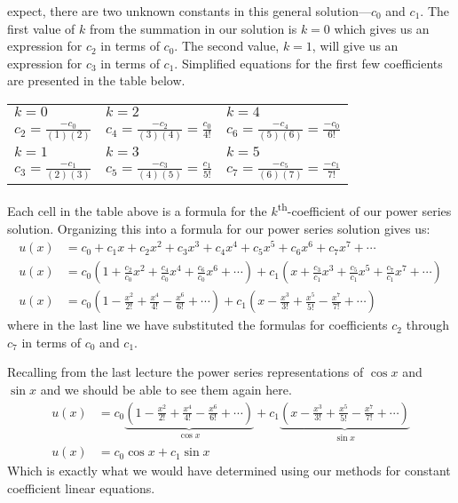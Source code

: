  expect, there are two unknown constants in this general solution---$c_0$ and $c_1$.  The first value of $k$ from the summation in our solution is $k=0$ which gives us an expression for $c_2$ in terms of $c_0$.  The second value, $k=1$, will give us an expression for $c_3$ in terms of $c_1$.  Simplified equations for the first few coefficients are presented in the table below.
\begin{table*}[h!]
\begin{tabular}{l | l | l}
$k=0$ & $k=2$ & $k=4$ \\
$c_2=\frac{-c_0}{(1)(2)}$ & $c_4=\frac{-c_2}{(3)(4)}=\frac{c_0}{4!}$ & $c_6 = \frac{-c_4}{(5)(6)} = \frac{-c_0}{6!}$ \\\hline
$k=1$ & $k=3$ & $k=5$ \\
$c_3 = \frac{-c_1}{(2)(3)}$ & $c_5 = \frac{-c_3}{(4)(5)}=\frac{c_1}{5!}$ & $c_7=\frac{-c_5}{(6)(7)} = \frac{-c_1}{7!}$\\
\end{tabular}
\end{table*}

\vspace{0.25cm}

\noindent Each cell in the table above is a formula for the $k$\textsuperscript{th}-coefficient of our power series solution.  Organizing this into a formula for our power series solution gives us:
\begin{align*}
u(x) &= c_0 + c_1x + c_2x^2+c_3x^3+c_4x^4+c_5x^5+c_6x^6+c_7x^7 + \cdots \\
u(x) &= c_0\left(1 + \frac{c_2}{c_0}x^2 + \frac{c_4}{c_0}x^4 + \frac{c_6}{c_0}x^6 + \cdots \right) + c_1\left(x + \frac{c_3}{c_1}x^3 + \frac{c_5}{c_1}x^5 + \frac{c_7}{c_1}x^7 + \cdots \right) \\
u(x)&=c_0\left(1-\frac{x^2}{2!}+\frac{x^4}{4!}-\frac{x^6}{6!} + \cdots  \right) + c_1\left(x -\frac{x^3}{3!}+\frac{x^5}{5!} - \frac{x^7}{7!} + \cdots \right)
\end{align*}
where in the last line we have substituted the formulas for coefficients $c_2$ through $c_7$ in terms of $c_0$ and $c_1$.

Recalling from the last lecture the power series representations of $\cos{x}$ and $\sin{x}$ and we should be able to see them again here.
\begin{align*}
u(x)&=c_0\underbrace{\left(1-\frac{x^2}{2!}+\frac{x^4}{4!}-\frac{x^6}{6!} + \cdots  \right)}_{\cos{x}} + c_1\underbrace{\left(x -\frac{x^3}{3!}+\frac{x^5}{5!} - \frac{x^7}{7!} + \cdots \right)}_{\sin{x}} \\
u(x)&=c_0\cos{x} + c_1\sin{x}
\end{align*}
Which is exactly what we would have determined using our methods for constant coefficient linear equations.

